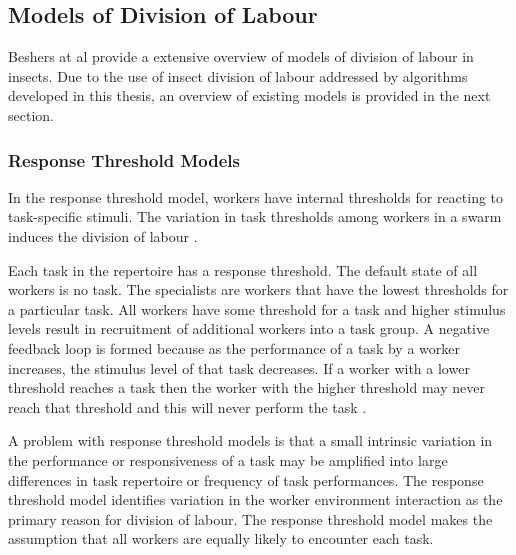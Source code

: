 
\subsection{Models of Division of Labour}

Beshers at al \cite{beshers2001models} provide a extensive overview of models of division of labour in insects. Due to the use of insect division of labour addressed by algorithms developed in this thesis, an overview of existing models is provided in the next section.

\subsubsection{Response Threshold Models}

In the response threshold model, workers have internal thresholds for reacting to task-specific stimuli. The variation in task thresholds among workers in a swarm induces the division of labour \cite{robinson1992regulation}.

Each task in the repertoire has a response threshold. The default state of all workers is no task. The specialists are workers that have the lowest thresholds for a particular task. All workers have some threshold for a task and higher stimulus levels result in recruitment of additional workers into a task group. A negative feedback loop is formed because as the performance of a task by a worker increases, the stimulus level of that task decreases. If a worker with a lower threshold reaches a task then the worker with the higher threshold may never reach that threshold and this will never perform the task \cite{beshers2001models}.

A problem with response threshold models is that a small intrinsic variation in the performance or responsiveness of a task may be amplified into large differences in task repertoire or frequency of task performances. The response threshold model identifies variation in the worker environment interaction as the primary reason for division of labour. The response threshold model makes the assumption that all workers are equally likely to encounter each task.
  
